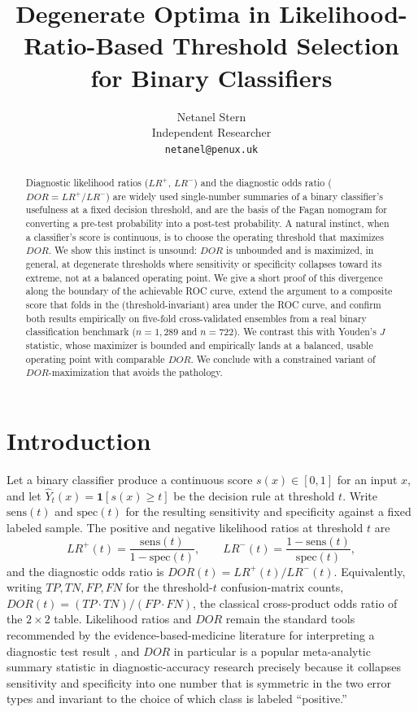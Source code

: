 \documentclass[11pt]{article}
\title{Degenerate Optima in Likelihood-Ratio-Based Threshold Selection\\
for Binary Classifiers}
\author{Netanel Stern \\ Independent Researcher \\ \texttt{netanel@penux.uk}}
\date{}
\begin{document}
\maketitle

\begin{abstract}
Diagnostic likelihood ratios ($LR^+$, $LR^-$) and the diagnostic odds ratio
($DOR = LR^+/LR^-$) are widely used single-number summaries of a binary
classifier's usefulness at a fixed decision threshold, and are the basis of
the Fagan nomogram for converting a pre-test probability into a post-test
probability. A natural instinct, when a classifier's score is continuous, is
to choose the operating threshold that maximizes $DOR$. We show this
instinct is unsound: $DOR$ is unbounded and is maximized, in general, at
degenerate thresholds where sensitivity or specificity collapses toward its
extreme, not at a balanced operating point. We give a short proof of this
divergence along the boundary of the achievable ROC curve, extend the
argument to a composite score that folds in the (threshold-invariant) area
under the ROC curve, and confirm both results empirically on five-fold
cross-validated ensembles from a real binary classification benchmark
($n=1{,}289$ and $n=722$). We contrast this with Youden's $J$ statistic,
whose maximizer is bounded and empirically lands at a balanced, usable
operating point with comparable $DOR$. We conclude with a constrained
variant of $DOR$-maximization that avoids the pathology.
\end{abstract}

\section{Introduction}

Let a binary classifier produce a continuous score $s(x) \in [0,1]$ for an
input $x$, and let $\hat{Y}_t(x) = \mathbf{1}[s(x) \geq t]$ be the decision
rule at threshold $t$. Write $\mathrm{sens}(t)$ and $\mathrm{spec}(t)$ for
the resulting sensitivity and specificity against a fixed labeled sample.
The positive and negative likelihood ratios at threshold $t$ are
\begin{equation}
LR^+(t) = \frac{\mathrm{sens}(t)}{1 - \mathrm{spec}(t)}, \qquad
LR^-(t) = \frac{1 - \mathrm{sens}(t)}{\mathrm{spec}(t)},
\end{equation}
and the diagnostic odds ratio is $DOR(t) = LR^+(t) / LR^-(t)$. Equivalently,
writing $TP, TN, FP, FN$ for the threshold-$t$ confusion-matrix counts,
$DOR(t) = (TP \cdot TN) / (FP \cdot FN)$, the classical cross-product odds
ratio of the $2\times2$ table. Likelihood ratios and $DOR$ remain the
standard tools recommended by the evidence-based-medicine literature for
interpreting a diagnostic test result
\citep{jaeschke1994a,jaeschke1994b,deeks2004,grimes2005,altman1994a,
altman1994b,vanstralen2009,simundic2009}, and $DOR$ in particular is a
popular meta-analytic summary statistic in diagnostic-accuracy research
\citep{glas2003} precisely because it collapses sensitivity and specificity
into one number that is symmetric in the two error types and invariant to
the choice of which class is labeled ``positive.''
\end{document}
